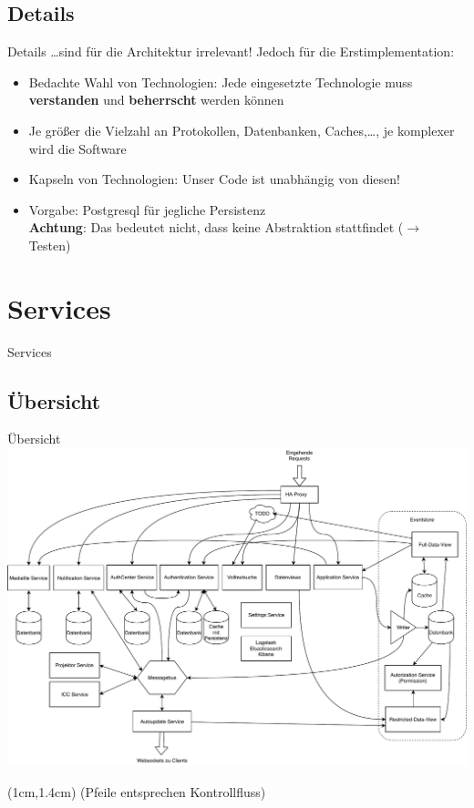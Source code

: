 \documentclass[10pt]{beamer}
\begin{document}
\subsection{Details}
\begin{frame}{Details}
	\ldots sind für die Architektur irrelevant! Jedoch für die Erstimplementation:
	\begin{itemize}
		\item<2-> Bedachte Wahl von Technologien: Jede eingesetzte Technologie muss \textbf{verstanden} und \textbf{beherrscht} werden können
		\item<3-> Je größer die Vielzahl an Protokollen, Datenbanken, Caches,\ldots, je komplexer wird die Software
		\item<4-> Kapseln von Technologien: Unser Code ist unabhängig von diesen!
		\item<5-> Vorgabe: Postgresql für jegliche Persistenz\\
		\textbf{Achtung}: Das bedeutet nicht, dass keine Abstraktion stattfindet ($\rightarrow$ Testen)
	\end{itemize}
\end{frame}

\section{Services}
\begin{frame}
\begin{center}
	Services
\end{center}
\end{frame}
\subsection{Übersicht}
\begin{frame}{Übersicht}
	\hspace*{-0.9cm}
	\includegraphics[scale=0.45]{services}
	\begin{textblock*}{5cm}(1cm,1.4cm) %
		{\color{gray} (Pfeile entsprechen Kontrollfluss)}
	\end{textblock*}
\end{frame}
\end{document}
